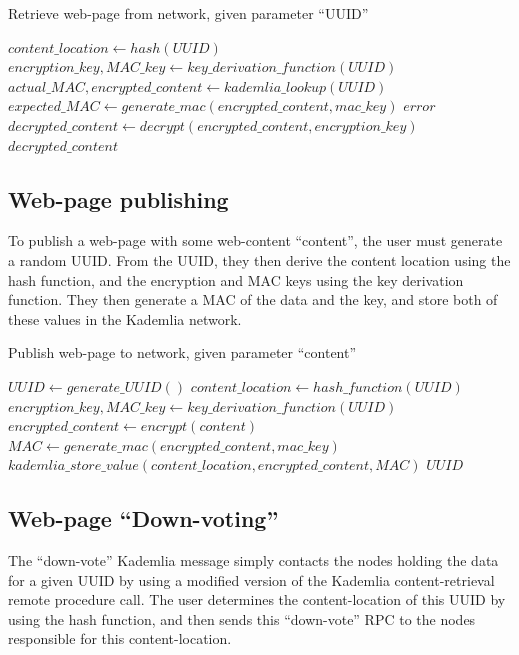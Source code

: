 \begin{algorithm}[H]
\caption{Retrieve web-page from network, given parameter ``UUID''}
\begin{algorithmic}
    \STATE $content\_location \leftarrow hash(UUID)$
    \STATE $encryption\_key, MAC\_key \leftarrow key\_derivation\_function(UUID) $
    \STATE $actual\_MAC, encrypted\_content \leftarrow kademlia\_lookup(UUID) $
    \STATE $expected\_MAC \leftarrow generate\_mac(encrypted\_content, mac\_key) $
    \RETURN $ error $
    \ENDIF
    \STATE $ decrypted\_content \leftarrow decrypt(encrypted\_content, encryption\_key) $
    \RETURN $ decrypted\_content $
\end{algorithmic}
\end{algorithm}

\subsection{Web-page publishing}

To publish a web-page with some web-content ``content'', the user must generate a random UUID. From the UUID, they
then derive the content location using the hash function, and the encryption and MAC keys using the key derivation function.
They then generate a MAC of the data and the key, and store both of these values in the Kademlia network.

\begin{algorithm}[H]
    \caption{Publish web-page to network, given parameter ``content''}
    \begin{algorithmic}
    \STATE $ UUID \leftarrow generate\_UUID() $
    \STATE $ content\_location \leftarrow hash\_function(UUID) $
    \STATE $ encryption\_key, MAC\_key \leftarrow key\_derivation\_function(UUID) $
    \STATE $ encrypted\_content \leftarrow encrypt(content) $
    \STATE $ MAC \leftarrow generate\_mac(encrypted\_content, mac\_key) $
    \STATE $ kademlia\_store\_value(content\_location, encrypted\_content, MAC) $
    \RETURN $ UUID $
    \end{algorithmic}
\end{algorithm}

\subsection{Web-page ``Down-voting''}

The ``down-vote'' Kademlia message simply contacts the nodes holding the data for a given UUID by
using a modified version of the Kademlia content-retrieval remote procedure call. The user determines the
content-location of this UUID by using the hash function, and then sends this ``down-vote'' RPC to the nodes
responsible for this content-location.
